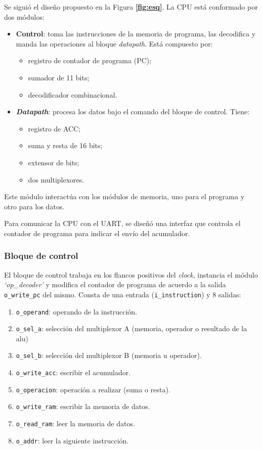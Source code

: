 \documentclass[12pt,a4paper]{article}
\begin{document}
Se siguió el diseño propuesto en la Figura \textbf{\ref{fig:esq}}. La CPU está conformado por dos módulos:

\begin{itemize}
\item \textbf{Control}: toma las instrucciones de la memoria de programa, las decodifica y manda las operaciones al bloque \emph{datapath}. Está compuesto por:

	\begin{itemize}
	\item registro de contador de programa (PC);
	\item sumador de 11 bits;
	\item decodificador combinacional.
	\end{itemize}

\item \textbf{\emph{Datapath}}: procesa los datos bajo el comando del bloque de control. Tiene:

	\begin{itemize}
	\item registro de ACC;
 	\item suma y resta de 16 bits;
 	\item extensor de bits;
 	\item dos multiplexores.
	\end{itemize}
\end{itemize}

Este módulo interactúa con los módulos de memoria, uno para el programa y otro para los datos.

Para comunicar la CPU con el UART, se diseñó una interfaz que controla el contador de programa para indicar el envío del acumulador.

\subsubsection{Bloque de control}
\label{subss:control}

El bloque de control trabaja en los flancos positivos del \emph{clock}, instancia el módulo \emph{`op\_decoder'} y modifica el contador de programa de acuerdo a la salida \verb|o_write_pc| del mismo.
Consta de una entrada (\verb|i_instruction|) y 8 salidas:

\begin{enumerate}
\item \verb|o_operand|: operando de la instrucción.
\item \verb|o_sel_a|: selección del multiplexor A (memoria, operador o resultado de la alu)
\item \verb|o_sel_b|: selección del multiplexor B (memoria u operador).
\item \verb|o_write_acc|: escribir el acumulador.
\item \verb|o_operacion|: operación a realizar (suma o resta).
\item \verb|o_write_ram|: escribir la memoria de datos.
\item \verb|o_read_ram|: leer la memoria de datos.
\item \verb|o_addr|: leer la siguiente instrucción.
\end{enumerate}
\end{document}
